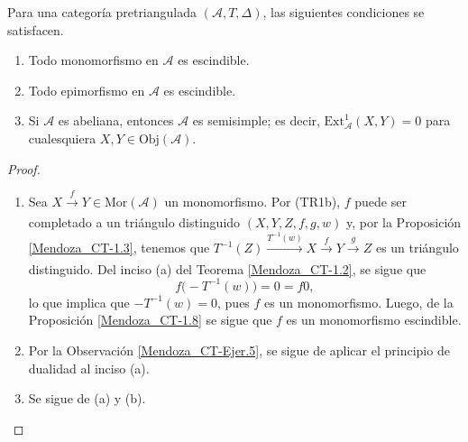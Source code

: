 \documentclass[tesis]{subfiles}
\begin{document}
    

\begin{Coro}\label{Mendoza_CT-1.9}
    Para una categoría pretriangulada $(\mathscr{A},T,\Delta)$, las siguientes condiciones se satisfacen.

    \begin{enumerate}[label=(\alph*)]
    
        \item Todo monomorfismo en $\mathscr{A}$ es escindible.

        \item Todo epimorfismo en $\mathscr{A}$ es escindible.

        \item Si $\mathscr{A}$ es abeliana, entonces $\mathscr{A}$ es semisimple; es decir, $\text{Ext}_{\mathscr{A}}^{1}(X,Y)=0$ para cualesquiera $X,Y\in\text{Obj}(\mathscr{A})$.
    \end{enumerate}
\end{Coro}

\begin{proof}\leavevmode

    \begin{enumerate}[label=(\alph*)]
    
        \item Sea $X\xrightarrow[]{f}Y\in\text{Mor}(\mathscr{A})$ un monomorfismo. Por (TR1b), $f$ puede ser completado a un triángulo distinguido $(X,Y,Z,f,g,w)$ y, por la Proposición \ref{Mendoza_CT-1.3}, tenemos que $T^{-1}(Z)\xrightarrow[]{T^{-1}(w)} X\xrightarrow[]{f}Y \xrightarrow[]{g}Z$ es un triángulo distinguido. Del inciso (a) del Teorema \ref{Mendoza_CT-1.2}, se sigue que 
            \[
                f\big(-T^{-1}(w)\big) = 0 = f0,
            \]
            lo que implica que $-T^{-1}(w)=0$, pues $f$ es un monomorfismo. Luego, de la Proposición \ref{Mendoza_CT-1.8} se sigue que $f$ es un monomorfismo escindible.

        \item Por la Observación \ref{Mendoza_CT-Ejer.5}, se sigue de aplicar el principio de dualidad al inciso (a). 

        \item Se sigue de (a) y (b).
    \end{enumerate}
\end{proof}
\end{document}
